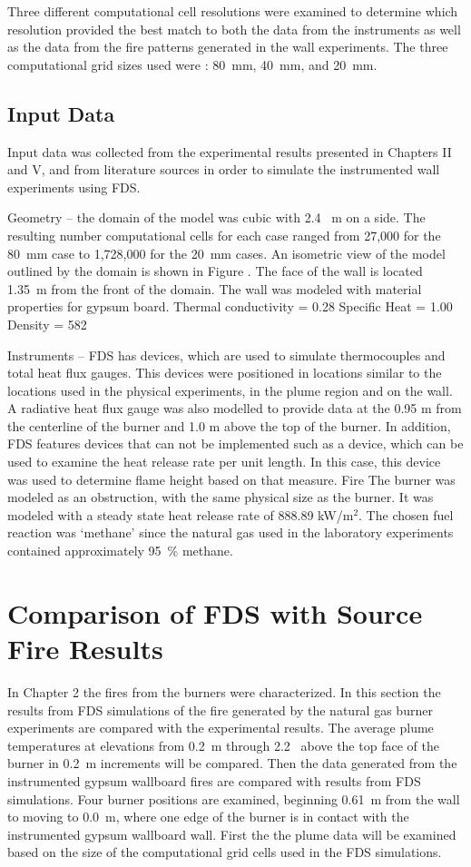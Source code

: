 \documentclass[twoside]{uocthesis}
\begin{document}
Three different computational cell resolutions were examined to determine which resolution provided the best match to both the data from the instruments as well as the data from the fire patterns generated in the wall experiments.  The three computational grid sizes used were : 80~mm, 40~mm, and 20~mm. 

\subsection{Input Data}

Input data was collected from the experimental results presented in Chapters II and V, and from literature sources in order to simulate the instrumented wall experiments using FDS. 

Geometry – the domain of the model was cubic with 2.4~ m on a side.  The resulting number computational cells for each case ranged from 27,000 for the 80~mm case to 1,728,000 for the 20~mm cases.   An isometric view of the model outlined by the domain is shown in Figure     .  The face of the wall is located 1.35~m from the front of the domain.  
The wall was modeled with material properties for gypsum board.
Thermal conductivity = 0.28
Specific Heat = 1.00
Density = 582

Instruments – FDS has devices, which are used to simulate thermocouples and total heat flux gauges.  This devices were positioned  in locations similar to the locations used in the physical experiments, in the plume region and on the wall.   A radiative heat flux gauge was also modelled to provide data at the 0.95 m from the centerline of the burner and 1.0 m above the top of the burner.  
In addition, FDS features devices that can not be implemented such as a device, which can be used to examine the heat release rate per unit length.  In this case, this device was used to determine flame height based on that measure.     
Fire 
The burner was modeled as an obstruction, with the same physical size as the burner.  It was modeled with a steady state heat release rate of 888.89 kW/m$^2$.   The chosen fuel reaction was `methane' since the natural gas used in the laboratory experiments contained approximately 95~\% methane.  


\section{Comparison of FDS with Source Fire Results}

In Chapter 2 the fires from the burners were characterized.  In this section the results from FDS simulations of the fire generated by the natural gas burner experiments are compared with the experimental results.  The average plume temperatures at elevations from 0.2~m through 2.2~ above the top face of the burner in 0.2~m increments will be compared.  Then the data generated from the instrumented gypsum wallboard fires are compared with results from FDS simulations.  Four burner positions are examined, beginning 0.61~m from the wall to moving to 0.0~m, where one edge of the burner is in contact with the instrumented gypsum wallboard wall.  First the the plume data will be examined based on the size of the computational grid cells used in the FDS simulations.  
\end{document}
